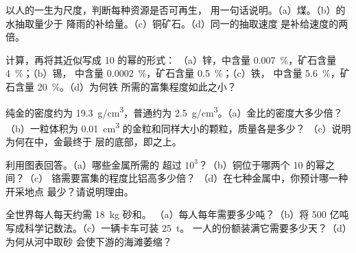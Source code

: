 \begin{exercise}[$\star$]\label{exo:g9:earth-resources:4}
以人的一生为尺度，判断每种资源是否可再生，
用一句话说明。（a）煤。（b）的水抽取量少于
降雨的补给量。（c）铜矿石。（d）同一的抽取速度
是补给速度的两倍。
\end{exercise}

\begin{exercise}[$\star\star$]\label{exo:g9:earth-resources:5}
计算，再将其近似写成 10 的幂的形式：
（a）锌，中含量 \qty{0.007}{\%}，矿石含量 \qty{4}{\%}；（b）锡，
中含量 \qty{0.0002}{\%}，矿石含量 \qty{0.5}{\%}；（c）铁，
中含量 \qty{5.6}{\%}，矿石含量 \qty{20}{\%}。（d）为何铁
所需的富集程度如此之小？
\end{exercise}

\begin{exercise}[$\star\star$]\label{exo:g9:earth-resources:6}
纯金的密度约为 \qty{19.3}{g/cm^3}，普通约为
\qty{2.5}{g/cm^3}。（a）金比的密度大多少倍？（b）一粒体积为
\qty{0.01}{cm^3} 的金粒和同样大小的颗粒，质量各是多少？
（c）说明为何在中，金最终于
层的底部，即之上。
\end{exercise}

\begin{exercise}[$\star\star$]\label{exo:g9:earth-resources:7}
利用图表回答。（a）哪些金属所需的
超过 $10^3$？（b）铜位于哪两个 10 的幂之间？（c）
铬需要富集的程度比铝高多少倍？
（d）在七种金属中，你预计哪一种开采地点
最少？请说明理由。
\end{exercise}

\begin{exercise}[$\star\star$]\label{exo:g9:earth-resources:8}
全世界每人每天约需 \qty{18}{kg} 砂和。
（a）每人每年需要多少吨？（b）将 500
亿吨写成科学记数法。（c）一辆卡车可装 \qty{25}{t}。
一人的份额装满它需要多少天？（d）为何从河中取砂
会使下游的海滩萎缩？
\end{exercise}

